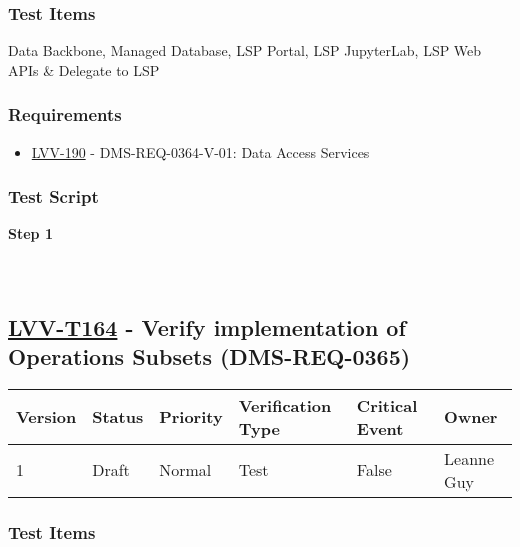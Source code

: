 \hypertarget{test-items-139}{%
\subsubsection{Test Items}\label{test-items-139}}

Data Backbone, Managed Database, LSP Portal, LSP JupyterLab, LSP Web
APIs \& Delegate to LSP

\hypertarget{requirements-140}{%
\subsubsection{Requirements}\label{requirements-140}}

\begin{itemize}
\tightlist
\item
  \href{https://jira.lsstcorp.org/browse/LVV-190}{LVV-190} -
  DMS-REQ-0364-V-01: Data Access Services
\end{itemize}

\hypertarget{test-script-140}{%
\subsubsection{Test Script}\label{test-script-140}}

\textbf{Step 1}\\
~\\
~\\

\hypertarget{lvv-t164---verify-implementation-of-operations-subsets-dms-req-0365}{%
\subsection{\texorpdfstring{\href{https://jira.lsstcorp.org/secure/Tests.jspa\#/testCase/LVV-T164}{LVV-T164}
- Verify implementation of Operations Subsets
(DMS-REQ-0365)}{LVV-T164 - Verify implementation of Operations Subsets (DMS-REQ-0365)}}\label{lvv-t164---verify-implementation-of-operations-subsets-dms-req-0365}}

\begin{longtable}[]{@{}llllll@{}}
\toprule
Version & Status & Priority & Verification Type & Critical Event &
Owner\tabularnewline
\midrule
\endhead
1 & Draft & Normal & Test & False & Leanne Guy\tabularnewline
\bottomrule
\end{longtable}

\hypertarget{test-items-140}{%
\subsubsection{Test Items}\label{test-items-140}}

